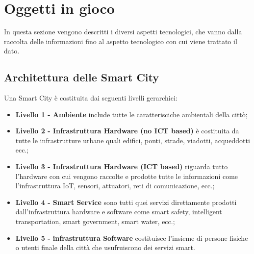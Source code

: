 \section{Oggetti in gioco}
In questa sezione vengono descritti i diversi aspetti tecnologici, che vanno dalla raccolta delle informazioni fino al aspetto tecnologico con cui viene trattato il dato.

\subsection{Architettura delle Smart City}
Una Smart City è costituita dai seguenti livelli gerarchici:\cite{smart:city_cybersecurity_privacy_cap4}
\begin{itemize}
  \item \textbf{Livello 1 - Ambiente} include tutte le caratterisciche ambientali della cittò;
  \item \textbf{Livello 2 - Infrastruttura Hardware (no ICT based)} è costituita da tutte le infrastrutture urbane quali edifici, ponti, strade, viadotti, acqueddotti ecc.;
  \item \textbf{Livello 3 - Infrastruttura Hardware (ICT based)} riguarda tutto l'hardware con cui vengono raccolte e prodotte tutte le informazioni come l'infrastruttura IoT, sensori, attuatori, reti di comunicazione, ecc.;
  \item \textbf{Livello 4 - Smart Service} sono tutti quei servizi direttamente prodotti dall'infrastruttura hardware e software come smart safety, intelligent transportation, smart government, smart water, ecc.;
  \item \textbf{Livello 5 - infrastruttura Software} costituisce l'insieme di persone fisiche o utenti finale della città che usufruiscono dei servizi smart.
  
\end{itemize}


